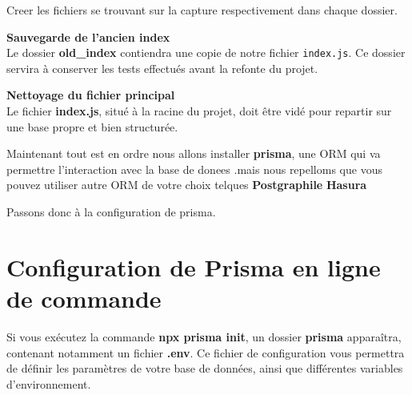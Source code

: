 \documentclass{article}
\begin{document}
\vspace{0.5cm}
Creer les fichiers se trouvant sur la capture respectivement dans chaque dossier.

\noindent
\textbf{\faFolder Sauvegarde de l'ancien index} \\
Le dossier \textbf{old\_index} contiendra une copie de notre fichier \texttt{index.js}. Ce dossier servira à conserver les tests effectués avant la refonte du projet.

\vspace{0.5cm}

\noindent
\textbf{\faFolder Nettoyage du fichier principal} \\
Le fichier \textbf{index.js}, situé à la racine du projet, doit être vidé pour repartir sur une base propre et bien structurée.

\vspace{0.5cm}
\noindent



Maintenant tout est en ordre nous allons installer \textbf{prisma}, une ORM qui va permettre l'interaction avec la base de donees .mais nous repelloms que vous pouvez utiliser autre ORM de votre choix telques  \textbf{Postgraphile} \textbf{Hasura}

Passons donc à la configuration de prisma.



\section{Configuration de Prisma en ligne de commande}

Si vous exécutez la commande \textbf{npx prisma init}, un dossier \textbf{prisma} apparaîtra, contenant notamment un fichier  \textbf{.env}. Ce fichier de configuration vous permettra de définir les paramètres de votre base de données, ainsi que différentes variables d’environnement.
\end{document}
